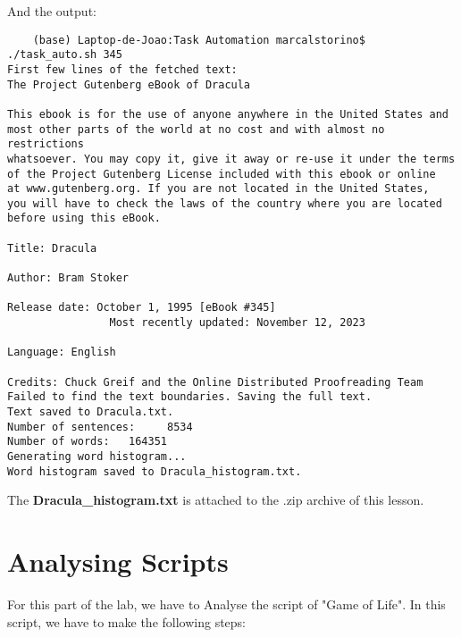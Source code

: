 \documentclass[a4paper, 12pt]{article}
\begin{document}
And the output:

\begin{lstlisting}
    (base) Laptop-de-Joao:Task Automation marcalstorino$ ./task_auto.sh 345
First few lines of the fetched text:
The Project Gutenberg eBook of Dracula
    
This ebook is for the use of anyone anywhere in the United States and
most other parts of the world at no cost and with almost no restrictions
whatsoever. You may copy it, give it away or re-use it under the terms
of the Project Gutenberg License included with this ebook or online
at www.gutenberg.org. If you are not located in the United States,
you will have to check the laws of the country where you are located
before using this eBook.

Title: Dracula

Author: Bram Stoker

Release date: October 1, 1995 [eBook #345]
                Most recently updated: November 12, 2023

Language: English

Credits: Chuck Greif and the Online Distributed Proofreading Team
Failed to find the text boundaries. Saving the full text.
Text saved to Dracula.txt.
Number of sentences:     8534
Number of words:   164351
Generating word histogram...
Word histogram saved to Dracula_histogram.txt.

\end{lstlisting}

The \textbf{Dracula\_histogram.txt} is attached to the .zip archive of this lesson.

\section{Analysing Scripts}
For this part of the lab, we have to Analyse the script of "Game of Life". In this script, we have to make the following steps:
\end{document}
